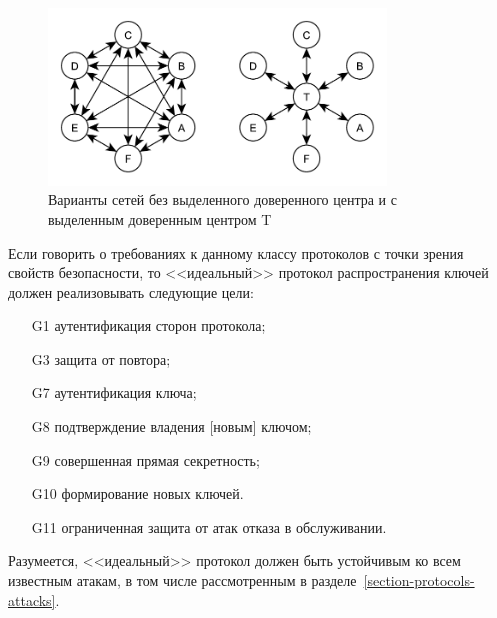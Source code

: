 \begin{figure}[!htb]
    \centering
    \includegraphics[width=0.8\textwidth]{pic/key_distribution-networks}
    \caption{Варианты сетей без выделенного доверенного центра и с выделенным доверенным центром T\label{fig:key_distribution-networks}}
\end{figure}

Если говорить о требованиях к данному классу протоколов с точки зрения свойств безопасности, то <<идеальный>> протокол распространения ключей должен реализовывать следующие цели:
\begin{itemize}
    \item[G1] аутентификация сторон протокола;
    \item[G3] защита от повтора;
    \item[G7] аутентификация ключа;
    \item[G8] подтверждение владения [новым] ключом;
    \item[G9] совершенная прямая секретность;
    \item[G10] формирование новых ключей.
    \item[G11] ограниченная защита от атак отказа в обслуживании.
\end{itemize}

Разумеется, <<идеальный>> протокол должен быть устойчивым ко всем известным атакам, в том числе рассмотренным в разделе~\ref{section-protocols-attacks}.








